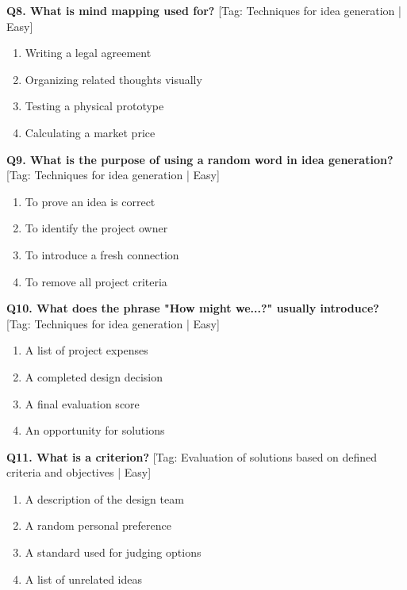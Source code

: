 \noindent\textbf{Q8. What is mind mapping used for?} \hfill [Tag: Techniques for idea generation | Easy]
\begin{enumerate}[label=(\alph*),topsep=2pt,itemsep=1pt,partopsep=0pt,parsep=0pt]
    \item {Writing a legal agreement}
    \item {Organizing related thoughts visually}
    \item {Testing a physical prototype}
    \item {Calculating a market price}
\end{enumerate}
\vspace{2mm}

\noindent\textbf{Q9. What is the purpose of using a random word in idea generation?} \hfill [Tag: Techniques for idea generation | Easy]
\begin{enumerate}[label=(\alph*),topsep=2pt,itemsep=1pt,partopsep=0pt,parsep=0pt]
    \item {To prove an idea is correct}
    \item {To identify the project owner}
    \item {To introduce a fresh connection}
    \item {To remove all project criteria}
\end{enumerate}
\vspace{2mm}

\noindent\textbf{Q10. What does the phrase "How might we...?" usually introduce?} \hfill [Tag: Techniques for idea generation | Easy]
\begin{enumerate}[label=(\alph*),topsep=2pt,itemsep=1pt,partopsep=0pt,parsep=0pt]
    \item {A list of project expenses}
    \item {A completed design decision}
    \item {A final evaluation score}
    \item {An opportunity for solutions}
\end{enumerate}
\vspace{2mm}

\noindent\textbf{Q11. What is a criterion?} \hfill [Tag: Evaluation of solutions based on defined criteria and objectives | Easy]
\begin{enumerate}[label=(\alph*),topsep=2pt,itemsep=1pt,partopsep=0pt,parsep=0pt]
    \item {A description of the design team}
    \item {A random personal preference}
    \item {A standard used for judging options}
    \item {A list of unrelated ideas}
\end{enumerate}
\vspace{2mm}

